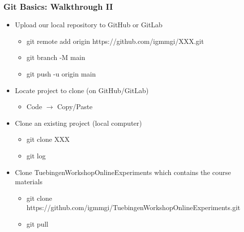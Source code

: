 \documentclass[t]{beamer}
\begin{document}
\begin{frame}[fragile]
    \frametitle{Git Basics: Walkthrough II}
    \begin{itemize}
        \item Upload our local repository to GitHub or GitLab
            \begin{itemize}
                \item git remote add origin https://github.com/igmmgi/XXX.git
                \item git branch -M main\footnotemark
                \item git push -u origin main
            \end{itemize}
        \item Locate project to clone (on GitHub/GitLab)
            \begin{itemize}
                \item Code $\rightarrow$ Copy/Paste
            \end{itemize}
        \item Clone an existing project (local computer)
            \begin{itemize}
                \item git clone XXX 
                \item git log
            \end{itemize}
        \item Clone TuebingenWorkshopOnlineExperiments which contains the course materials
            \begin{itemize}\scriptsize
                \item git clone https://github.com/igmmgi/TuebingenWorkshopOnlineExperiments.git
                \item git pull
            \end{itemize}
    \end{itemize}
\end{frame}
\end{document}
